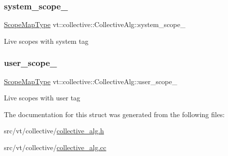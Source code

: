 \mbox{\label{structvt_1_1collective_1_1_collective_alg_a947ce4f129e1cf626da031595fe5df5c}} 
\subsubsection{\texorpdfstring{system\+\_\+scope\+\_\+}{system\_scope\_}}
{\footnotesize\ttfamily \hyperlink{structvt_1_1collective_1_1_collective_alg_abf644b20fe35cf654f5d4a6702ef5183}{Scope\+Map\+Type} vt\+::collective\+::\+Collective\+Alg\+::system\+\_\+scope\+\_\+\hspace{0.3cm}{\ttfamily [private]}}

Live scopes with system tag \mbox{\label{structvt_1_1collective_1_1_collective_alg_a72bb12e5bbe0c52e867c81e76db318d9}} 
\subsubsection{\texorpdfstring{user\+\_\+scope\+\_\+}{user\_scope\_}}
{\footnotesize\ttfamily \hyperlink{structvt_1_1collective_1_1_collective_alg_abf644b20fe35cf654f5d4a6702ef5183}{Scope\+Map\+Type} vt\+::collective\+::\+Collective\+Alg\+::user\+\_\+scope\+\_\+\hspace{0.3cm}{\ttfamily [private]}}

Live scopes with user tag 

The documentation for this struct was generated from the following files\+:\begin{DoxyCompactItemize}
\item 
src/vt/collective/\hyperlink{collective__alg_8h}{collective\+\_\+alg.\+h}\item 
src/vt/collective/\hyperlink{collective__alg_8cc}{collective\+\_\+alg.\+cc}\end{DoxyCompactItemize}
